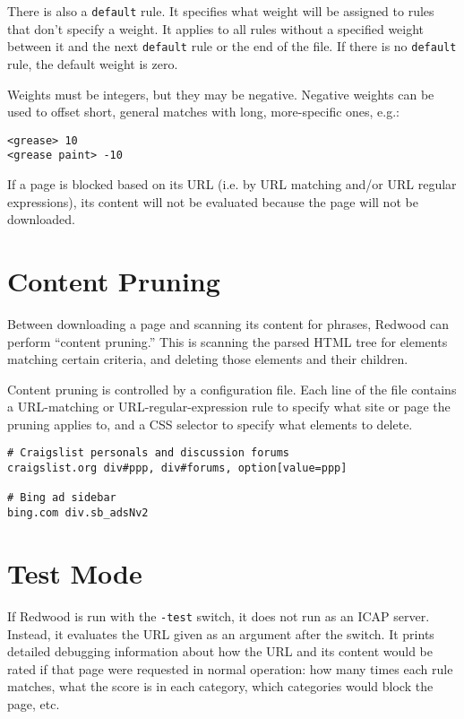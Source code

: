 \documentclass{article}
\begin{document}
There is also a \verb"default" rule. It specifies what weight will be assigned to rules that don't specify a weight. 
It applies to all rules without a specified weight between it and the next \verb"default" rule or the end of the file. 
If there is no \verb"default" rule, the default weight is zero.

Weights must be integers, but they may be negative. Negative weights can be used to offset short, general matches 
with long, more-specific ones, e.g.:

\begin{verbatim}
<grease> 10
<grease paint> -10
\end{verbatim}

If a page is blocked based on its URL (i.e. by URL matching and/or URL regular expressions), 
its content will not be evaluated because the page will not be downloaded.

\section{Content Pruning}

Between downloading a page and scanning its content for phrases, 
Redwood can perform ``content pruning.'' 
This is scanning the parsed HTML tree for elements matching certain criteria,
and deleting those elements and their children.

Content pruning is controlled by a configuration file.
Each line of the file contains a URL-matching or URL-regular-expression rule
to specify what site or page the pruning applies to, 
and a CSS selector to specify what elements to delete.

\begin{verbatim}
# Craigslist personals and discussion forums
craigslist.org div#ppp, div#forums, option[value=ppp]

# Bing ad sidebar
bing.com div.sb_adsNv2
\end{verbatim}

\section{Test Mode}

If Redwood is run with the \verb"-test" switch, it does not run as an ICAP server. 
Instead, it evaluates the URL given as an argument after the switch.
It prints detailed debugging information about how the URL and its content would be rated
if that page were requested in normal operation: how many times each rule matches, 
what the score is in each category, which categories would block the page, etc.
\end{document}
